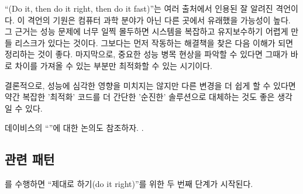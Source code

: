 \documentclass[a4paper,10pt,twoside]{book}
\begin{document}
``(Do it, then do it right, then do it fast)''는 여러 출처에서 인용된 잘 알려진 격언이다. 이 격언의 기원은 컴퓨터 과학 분야가 아닌 다른 곳에서 유래했을 가능성이 높다. 그 근거는 성능 문제에 너무 일찍 몰두하면 시스템을 복잡하고 유지보수하기 어렵게 만들 리스크가 있다는 것이다. 그보다는 먼저 작동하는 해결책을 찾은 다음 이해가 되면 정리하는 것이 좋다. 마지막으로, 중요한 성능 병목 현상을 파악할 수 있다면 그때가 바로 차이를 가져올 수 있는 부분만 최적화할 수 있는 시기이다.

결론적으로, 성능에 심각한 영향을 미치지는 않지만 다른 변경을 더 쉽게 할 수 있다면 약간 복잡한 '최적화' 코드를 더 간단한 '순진한' 솔루션으로 대체하는 것도 좋은 생각일 수 있다. 

데이비스의 ``''에 대한 논의도 참조하자. \cite{Davi95a}.

\subsection*{관련 패턴}

를 수행하면 ``제대로 하기(do it right)''를 위한 두 번째 단계가 시작된다.

\ifx\wholebook\relax\else
   
   
   
\end{document}
